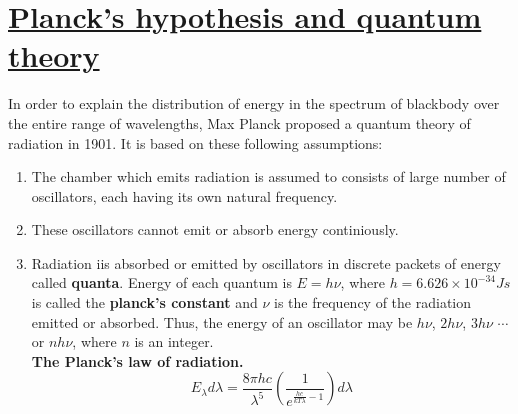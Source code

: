 \documentclass[14pt,a4paper]{article}
\begin{document}
\section{\underline{Planck's hypothesis and quantum theory}}
In order to explain the distribution of energy in the spectrum of blackbody over the entire range of wavelengths, Max Planck proposed a quantum theory of radiation in 1901. It is based on these following assumptions:
\begin{enumerate}
    \item The chamber which emits radiation is assumed to consists of large number of oscillators, each having its own natural frequency.
    \item These oscillators cannot emit or absorb energy continiously.
    \item Radiation iis absorbed or emitted by oscillators in discrete packets of energy called  \textbf{quanta}. Energy of each quantum is $E = h\nu$, where $h = 6.626 \times 10^{-34} Js$ is called the \textbf{planck's constant} and $\nu$ is the frequency of the radiation emitted or absorbed. Thus, the energy of an oscillator may be $h\nu$, $2h\nu$, $3h\nu$ $\cdots$ or $nh\nu$, where $n$ is an integer.
    \\
    \textbf{The Planck's law of radiation.}
    \begin{equation}
        E_{\lambda} d\lambda = \frac{8\pi hc}{\lambda^{5}} \left( \frac{1}{e^{\frac{hc} {kT \lambda} -1 } }  \right)d\lambda
    \end{equation}
\end{enumerate}
\end{document}
